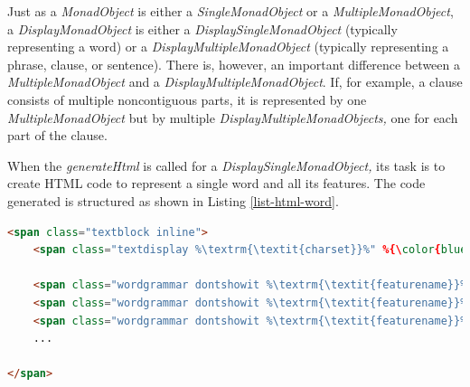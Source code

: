 \documentclass[11pt,oneside,a4paper]{memoir}
\begin{document}
Just as a \emph{MonadObject} is either a \emph{SingleMonadObject}%
or a \emph{MultipleMonadObject},%
a \emph{DisplayMonadObject} is either a \emph{DisplaySingleMonadObject}%
(typically representing a word) or a \emph{DisplayMultipleMonadObject}%
(typically representing a phrase, clause, or sentence).
There is, however, an important difference between a \emph{MultipleMonadObject} and a
\emph{DisplayMultipleMonadObject}. If, for example, a clause consists of multiple noncontiguous
parts, it is represented by one \emph{MultipleMonadObject} but by multiple
\emph{DisplayMultipleMonadObjects,} one for each part of the clause.

When the \emph{generateHtml} is called for a \emph{DisplaySingleMonadObject,} its task is to create
HTML code to represent a single word and all its features. The code generated is structured as shown
in Listing \ref{list-html-word}.

\begin{lstlisting}[language=HTML,caption=HTML display structure for a word object,label=list-html-word]
<span class="textblock inline">
    <span class="textdisplay %\textrm{\textit{charset}}%" %{\color{blue} data-idd}%="%\textrm{\textit{ID\_D}}%">%\textrm{\textit{text}}%</span>

    <span class="wordgrammar dontshowit %\textrm{\textit{featurename}}% %\textrm{\textit{charset}}%">%\textrm{\textit{featurevalue}}%</span>
    <span class="wordgrammar dontshowit %\textrm{\textit{featurename}}% %\textrm{\textit{charset}}%">%\textrm{\textit{featurevalue}}%</span>
    <span class="wordgrammar dontshowit %\textrm{\textit{featurename}}% %\textrm{\textit{charset}}%">%\textrm{\textit{featurevalue}}%</span>
    ...
  
</span>
\end{lstlisting}
\end{document}
